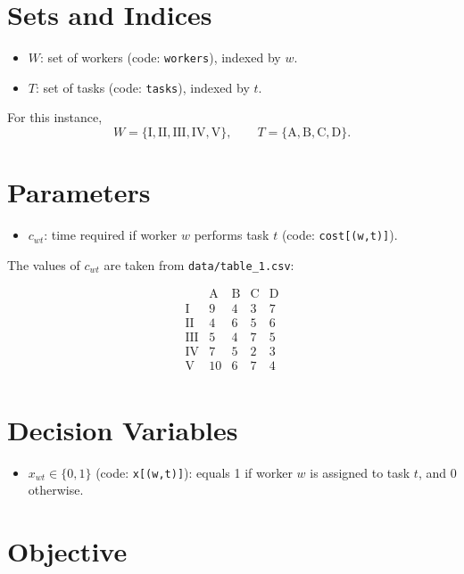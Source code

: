 \section*{Sets and Indices}

\begin{itemize}
    \item $W$: set of workers (code: \texttt{workers}), indexed by $w$.
    \item $T$: set of tasks (code: \texttt{tasks}), indexed by $t$.
\end{itemize}

For this instance,
\[
W=\{\mathrm{I},\mathrm{II},\mathrm{III},\mathrm{IV},\mathrm{V}\}, 
\qquad
T=\{\mathrm{A},\mathrm{B},\mathrm{C},\mathrm{D}\}.
\]

\section*{Parameters}

\begin{itemize}
    \item $c_{wt}$: time required if worker $w$ performs task $t$ (code: \texttt{cost[(w,t)]}).
\end{itemize}

The values of $c_{wt}$ are taken from \texttt{data/table\_1.csv}:

\[
\begin{array}{c|cccc}
 & \mathrm{A} & \mathrm{B} & \mathrm{C} & \mathrm{D} \\
\hline
\mathrm{I}   & 9  & 4 & 3 & 7 \\
\mathrm{II}  & 4  & 6 & 5 & 6 \\
\mathrm{III} & 5  & 4 & 7 & 5 \\
\mathrm{IV}  & 7  & 5 & 2 & 3 \\
\mathrm{V}   & 10 & 6 & 7 & 4 \\
\end{array}
\]

\section*{Decision Variables}

\begin{itemize}
    \item $x_{wt} \in \{0,1\}$ (code: \texttt{x[(w,t)]}): equals 1 if worker $w$ is assigned to task $t$, and 0 otherwise.
\end{itemize}

\section*{Objective}

